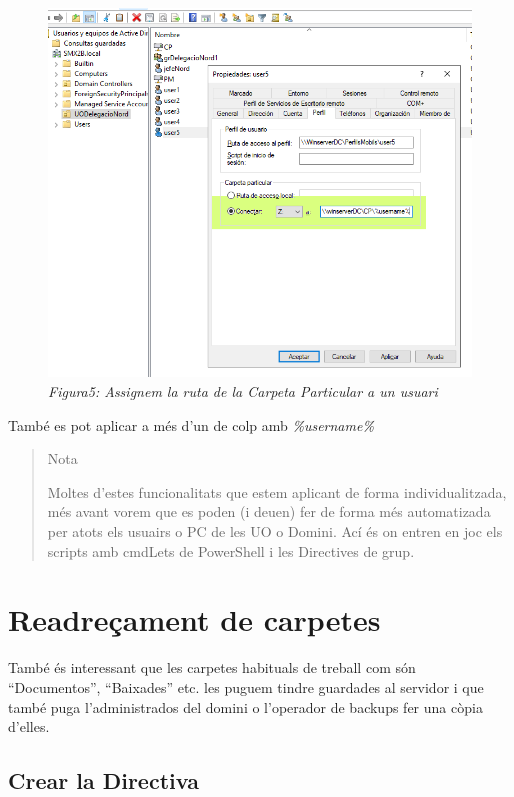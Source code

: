 \documentclass[
  a4paper,
]{article}
\begin{document}
\begin{figure}
\centering
\includegraphics{png/RutaCarpetaParticular.png}
\caption{\emph{Figura5: Assignem la ruta de la Carpeta Particular a un
usuari}}
\end{figure}

També es pot aplicar a més d'un de colp amb \emph{\%username\%}

\begin{quote}
Nota

Moltes d'estes funcionalitats que estem aplicant de forma
individualitzada, més avant vorem que es poden (i deuen) fer de forma
més automatizada per atots els usuairs o PC de les UO o Domini. Ací és
on entren en joc els scripts amb cmdLets de PowerShell i les Directives
de grup.
\end{quote}

\section{Readreçament de carpetes}\label{readreuxe7ament-de-carpetes}

També és interessant que les carpetes habituals de treball com són
``Documentos'', ``Baixades'' etc. les puguem tindre guardades al
servidor i que també puga l'administrados del domini o l'operador de
backups fer una còpia d'elles.

\subsection{Crear la Directiva}\label{crear-la-directiva}
\end{document}
